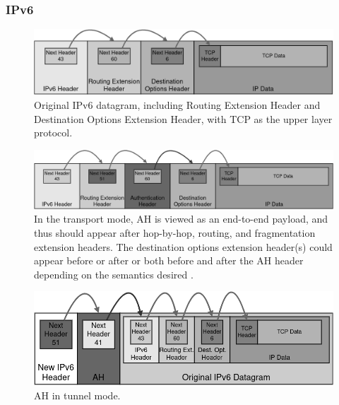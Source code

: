 \documentclass[a4paper,12pt]{report}
\begin{document}
		\newpage
		\subsubsection{IPv6}
		\begin{figure}[!h]
			\includegraphics[width=\textwidth]{original_ipv6_packet}
			\centering
			\caption{Original IPv6 datagram, including Routing Extension Header and Destination Options Extension Header, with TCP as the upper layer protocol.}
		\end{figure}
		
		\begin{figure}[h]
			\includegraphics[width=\textwidth]{ah_ipv6_transport}
			\centering
			\caption{In the transport mode, AH is viewed as an end-to-end payload, and thus should appear after hop-by-hop, routing, and fragmentation extension headers.  The destination options extension header(s) could appear before or after or both before and after the AH header depending on the semantics desired \cite{rfc4302}.}
		\end{figure}
		
		\begin{figure}[!h]
			\includegraphics[width=\textwidth]{ah_ipv6_tunnel}
			\centering
			\caption{AH in tunnel mode.}
		\end{figure}
	
		
\end{document}

